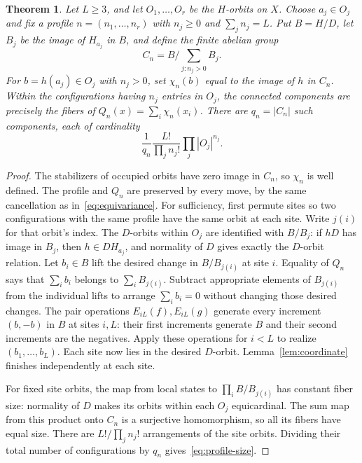 \documentclass[11pt]{article}
\newtheorem{theorem}{Theorem}
\theoremstyle{remark}
\begin{document}
\begin{theorem}\label{thm:profile}
Let $L\geq3$, and let $O_1,\ldots,O_r$ be the $H$-orbits on $X$.
Choose $a_j\in O_j$ and fix a profile $n=(n_1,\ldots,n_r)$ with
$n_j\geq0$ and $\sum_j n_j=L$. Put $B=H/D$, let $B_j$ be the image
of $H_{a_j}$ in $B$, and define the finite abelian group
\[
 C_n=B\Big/\sum_{j:n_j>0}B_j.
\]
For $b=h(a_j)\in O_j$ with $n_j>0$, set $\chi_n(b)$ equal to the image of $h$ in $C_n$.
Within the configurations having $n_j$ entries in $O_j$, the connected
components are precisely the fibers of $Q_n(x)=\sum_i\chi_n(x_i)$.
There are $q_n=|C_n|$ such components, each of cardinality
\begin{equation}\label{eq:profile-size}
 \frac{1}{q_n}\frac{L!}{\prod_j n_j!}\prod_j |O_j|^{n_j}.
\end{equation}
\end{theorem}
\begin{proof}
The stabilizers of occupied orbits have zero image in $C_n$, so $\chi_n$ is well defined.
The profile and $Q_n$ are preserved by every move, by the same cancellation
as in~\eqref{eq:equivariance}.
For sufficiency, first permute sites so two configurations with the same
profile have the same orbit at each site. Write $j(i)$ for that orbit's index.
The $D$-orbits within $O_j$ are identified with $B/B_j$:
if $hD$ has image in $B_j$, then $h\in D H_{a_j}$, and normality of $D$
gives exactly the $D$-orbit relation.
Let $b_i\in B$ lift the desired change in $B/B_{j(i)}$ at site $i$.
Equality of $Q_n$ says that $\sum_i b_i$ belongs to
$\sum_i B_{j(i)}$. Subtract appropriate elements of $B_{j(i)}$ from the
individual lifts to arrange $\sum_i b_i=0$ without changing those desired
changes. The pair operations $E_{iL}(f),E_{iL}(g)$ generate every increment
$(b,-b)$ in $B$ at sites $i,L$: their first increments generate $B$ and
their second increments are the negatives. Apply these operations for
$i<L$ to realize $(b_1,\ldots,b_L)$. Each site now lies in the desired
$D$-orbit. Lemma~\ref{lem:coordinate} finishes independently at each site.

For fixed site orbits, the map from local states to $\prod_i B/B_{j(i)}$
has constant fiber size: normality of $D$ makes its orbits within each
$O_j$ equicardinal. The sum map from this product onto $C_n$ is a
surjective homomorphism, so all its fibers have equal size. There are
$L!/\prod_j n_j!$ arrangements of the site orbits. Dividing their total
number of configurations by $q_n$ gives~\eqref{eq:profile-size}.
\end{proof}
\end{document}
